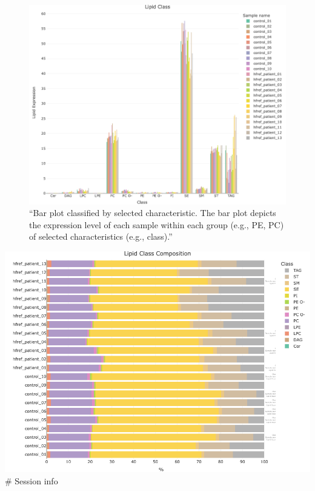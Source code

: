 \documentclass[]{article}
\newcommand{\hlcom}[1]{\textcolor[rgb]{0.502,0.502,0.502}{\textit{#1}}}%
\newcommand{\hlopt}[1]{\textcolor[rgb]{0,0,0}{#1}}%
\newcommand{\hlstd}[1]{\textcolor[rgb]{0.251,0.251,0.251}{#1}}%
\newenvironment{Shaded}{\begin{myshaded}}{\end{myshaded}}
\newcommand{\CommentTok}[1]{\hlcom{#1}}
\newcommand{\OperatorTok}[1]{\hlopt{#1}}
\newcommand{\NormalTok}[1]{\hlstd{#1}}
\begin{document}
\begin{figure}
\centering
\includegraphics{./image/exp_compo_by_lipidinfo_01.png}
\caption{``Bar plot classified by selected characteristic. The bar plot depicts the expression level of each sample within each group (e.g., PE, PC) of selected characteristics (e.g., class).''}
\end{figure}

\begin{Shaded}
\end{Shaded}

\includegraphics{./image/exp_compo_by_lipidinfo_02.png}
\# Session info
\end{document}
